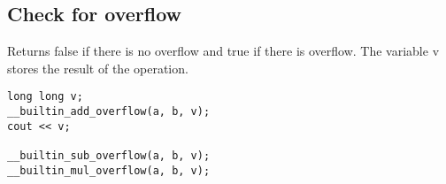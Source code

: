 \subsection{Check for overflow}
Returns false if there is no overflow and true if there is overflow. The variable v stores the result of the operation.
\begin{lstlisting}[style=c++, numbers=none]
long long v;
__builtin_add_overflow(a, b, v);
cout << v;

__builtin_sub_overflow(a, b, v);
__builtin_mul_overflow(a, b, v);
\end{lstlisting}